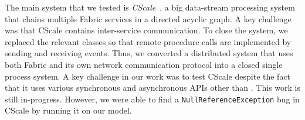 
The main system that we tested is \emph{CScale}~\cite{X},
a big data-stream processing system that chains multiple Fabric services
in a directed acyclic graph.
A key challenge was that
CScale contains inter-service communication.
To close the system,
we 
replaced the relevant classes
so that remote procedure calls are implemented
by sending and receiving \psharp{} events.
Thus,
we converted a distributed system
that uses both Fabric and its own
network communication protocol
into 
a closed single process system. 
A key challenge in our work
was to test CScale despite the fact that it
uses various synchronous and asynchronous APIs
other than \psharp{}.
This work is still in-progress.
However,
we were able to find a \texttt{NullReferenceException}
bug
in CScale
by running it on our model.











